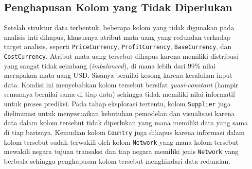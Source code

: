 \begin{table}[H]
  \centering
  \caption{Pratinjau 5 Baris Pertama Data Terurut Berdasarkan \textit{Year} dan \textit{Month}}
  \label{tab:preview_df_terurut}
  \par\vspace{4pt}

\end{table}

\subsection{Penghapusan Kolom yang Tidak Diperlukan}
Setelah struktur data terbentuk, beberapa kolom yang tidak digunakan pada analisis inti dihapus, khususnya atribut mata uang yang redundan terhadap target analisis, seperti \texttt{PriceCurrency}, \texttt{ProfitCurrency}, \texttt{BaseCurrency}, dan \texttt{CostCurrency}. Atribut mata uang tersebut dihapus karena memiliki distribusi yang sangat tidak seimbang (\textit{imbalanced}), di mana lebih dari 99\% nilai merupakan mata uang USD. Sisanya bernilai kosong karena kesalahan input data. Kondisi ini menyebabkan kolom tersebut bersifat \textit{quasi-constant} (hampir semuanya bernilai sama di tiap data) sehingga tidak memiliki nilai informatif untuk proses prediksi. Pada tahap eksplorasi tertentu, kolom \texttt{Supplier} juga dieliminasi untuk menyesuaikan kebutuhan pemodelan dan visualisasi karena data dalam kolom tersebut tidak diperlukan yang mana memiliki data yang sama di tiap barisnya. Kemudian kolom \texttt{Country} juga dihapus karena informasi dalam kolom tersebut sudah terwakili oleh kolom \texttt{Network} yang mana kolom tersebut mewakili negara tujuan transaksi dan tiap negara memiliki jenis \texttt{Network} yang berbeda sehingga penghapusan kolom tersebut menghindari data redundan. 

